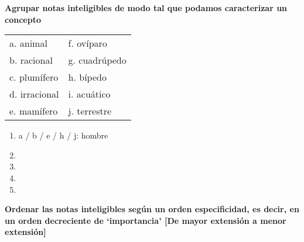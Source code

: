 \documentclass{article}
\begin{document}
\noindent\textbf{Agrupar notas inteligibles de modo tal que podamos caracterizar un concepto} \par

\noindent
\begin{tabular}{ l l } 
    a. animal      &  f. ovíparo    \\
    b. racional    &  g. cuadrúpedo \\
    c. plumífero   &  h. bípedo     \\
    d. irracional  &  i. acuático   \\
    e. mamífero    &  j. terrestre  \\
\end{tabular}

\begin{enumerate}
    \item a / b / e / h / j: hombre
    \item
    \item
    \item
    \item
\end{enumerate}

\noindent \textbf{Ordenar las notas inteligibles según un orden especificidad, es decir, en un orden decreciente de `importancia' [De mayor extensión a menor extensión]} \par
\end{document}
